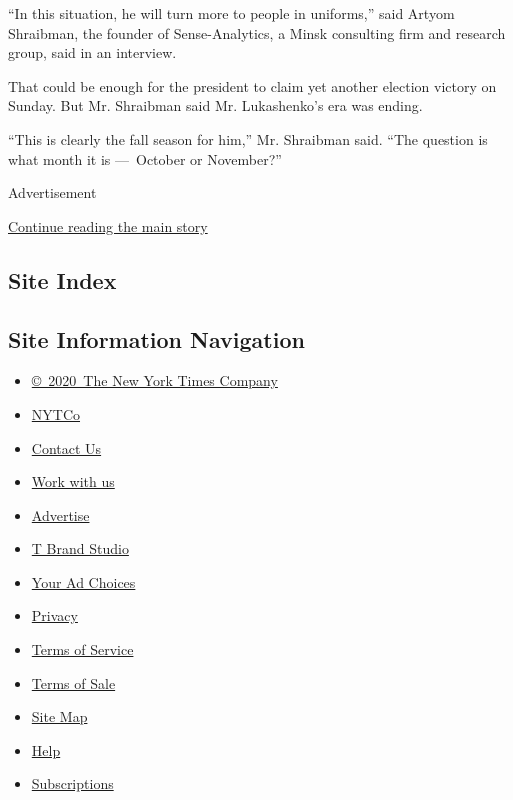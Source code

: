 ``In this situation, he will turn more to people in uniforms,'' said
Artyom Shraibman, the founder of Sense-Analytics, a Minsk consulting
firm and research group, said in an interview.

That could be enough for the president to claim yet another election
victory on Sunday. But Mr. Shraibman said Mr. Lukashenko's era was
ending.

``This is clearly the fall season for him,'' Mr. Shraibman said. ``The
question is what month it is ---~October or November?''

Advertisement

\protect\hyperlink{after-bottom}{Continue reading the main story}

\hypertarget{site-index}{%
\subsection{Site Index}\label{site-index}}

\hypertarget{site-information-navigation}{%
\subsection{Site Information
Navigation}\label{site-information-navigation}}

\begin{itemize}
\tightlist
\item
  \href{https://help.nytimes.com/hc/en-us/articles/115014792127-Copyright-notice}{©~2020~The
  New York Times Company}
\end{itemize}

\begin{itemize}
\tightlist
\item
  \href{https://www.nytco.com/}{NYTCo}
\item
  \href{https://help.nytimes.com/hc/en-us/articles/115015385887-Contact-Us}{Contact
  Us}
\item
  \href{https://www.nytco.com/careers/}{Work with us}
\item
  \href{https://nytmediakit.com/}{Advertise}
\item
  \href{http://www.tbrandstudio.com/}{T Brand Studio}
\item
  \href{https://www.nytimes.com/privacy/cookie-policy\#how-do-i-manage-trackers}{Your
  Ad Choices}
\item
  \href{https://www.nytimes.com/privacy}{Privacy}
\item
  \href{https://help.nytimes.com/hc/en-us/articles/115014893428-Terms-of-service}{Terms
  of Service}
\item
  \href{https://help.nytimes.com/hc/en-us/articles/115014893968-Terms-of-sale}{Terms
  of Sale}
\item
  \href{https://spiderbites.nytimes.com}{Site Map}
\item
  \href{https://help.nytimes.com/hc/en-us}{Help}
\item
  \href{https://www.nytimes.com/subscription?campaignId=37WXW}{Subscriptions}
\end{itemize}
